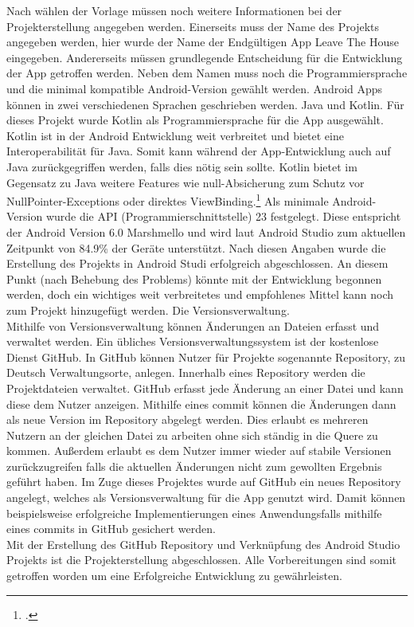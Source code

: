 Nach wählen der Vorlage müssen noch weitere Informationen bei der Projekterstellung angegeben werden.
Einerseits muss der Name des Projekts angegeben werden, hier wurde der Name der Endgültigen App \glqq Leave The House\grqq{} eingegeben. Andererseits müssen grundlegende Entscheidung für die Entwicklung der App getroffen werden. Neben dem Namen muss noch die Programmiersprache und die minimal kompatible Android-Version gewählt werden. Android Apps können in zwei verschiedenen Sprachen geschrieben werden. Java und Kotlin. Für dieses Projekt wurde Kotlin als Programmiersprache für die App ausgewählt. Kotlin ist in der Android Entwicklung weit verbreitet und bietet eine Interoperabilität für Java. Somit kann während der App-Entwicklung auch auf Java zurückgegriffen werden, falls dies nötig sein sollte. Kotlin bietet im Gegensatz zu Java weitere Features wie null-Absicherung zum Schutz vor NullPointer-Exceptions oder direktes ViewBinding.\footcite{Kotlin.2020} Als minimale Android-Version wurde die \ac{API} (Programmierschnittstelle) 23 festgelegt. Diese entspricht der Android Version 6.0 Marshmello und wird laut Android Studio zum aktuellen Zeitpunkt von 84.9\% der Geräte unterstützt. Nach diesen Angaben wurde die Erstellung des Projekts in Android Studi erfolgreich abgeschlossen. An diesem Punkt (nach Behebung des Problems) könnte mit der Entwicklung begonnen werden, doch ein wichtiges weit verbreitetes und empfohlenes Mittel kann noch zum Projekt hinzugefügt werden. Die Versionsverwaltung.\\
Mithilfe von Versionsverwaltung können Änderungen an Dateien erfasst und verwaltet werden. Ein übliches Versionsverwaltungssystem ist der kostenlose Dienst GitHub. In GitHub können Nutzer für Projekte sogenannte \glqq Repository\grqq{}, zu Deutsch Verwaltungsorte, anlegen. Innerhalb eines Repository werden die Projektdateien verwaltet. GitHub erfasst jede Änderung an einer Datei und kann diese dem Nutzer anzeigen. Mithilfe eines commit können die Änderungen dann als neue Version im Repository abgelegt werden. Dies erlaubt es mehreren Nutzern an der gleichen Datei zu arbeiten ohne sich ständig in die Quere zu kommen. Außerdem erlaubt es dem Nutzer immer wieder auf stabile Versionen zurückzugreifen falls die aktuellen Änderungen nicht zum gewollten Ergebnis geführt haben. Im Zuge dieses Projektes wurde auf GitHub ein neues Repository angelegt, welches als Versionsverwaltung für die App genutzt wird. Damit können beispielsweise erfolgreiche Implementierungen eines Anwendungsfalls mithilfe eines commits in GitHub gesichert werden.\\
Mit der Erstellung des GitHub Repository und Verknüpfung des Android Studio Projekts ist die Projekterstellung abgeschlossen. Alle Vorbereitungen sind somit getroffen worden um eine Erfolgreiche Entwicklung zu gewährleisten.


